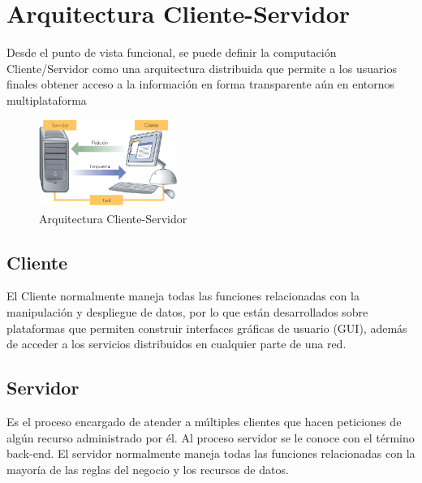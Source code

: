 \vspace{5cm}
\section{Arquitectura Cliente-Servidor}
Desde el punto de vista funcional, se puede definir la computación Cliente/Servidor como una arquitectura distribuida que permite a los usuarios finales obtener acceso a la información en forma transparente aún en entornos multiplataforma \cite{clientServ}
\\\newline
\begin{figure}[H]
\centering
\includegraphics[width=0.4\textwidth]{imagenes/servidor1}
\caption{Arquitectura Cliente-Servidor}
\label{img:clientserv}
\end{figure}
    
\subsection{Cliente}
El Cliente normalmente maneja todas las funciones relacionadas con la manipulación y despliegue de datos, por lo que están desarrollados sobre plataformas que permiten construir interfaces gráficas de usuario (GUI), además de acceder a los servicios distribuidos en cualquier parte de una red. \cite{clientServ} 
\\\newline
\subsection{Servidor}
Es el proceso encargado de atender a múltiples clientes que hacen peticiones de algún recurso administrado por él. Al proceso servidor se le conoce con el término back-end.
El servidor normalmente maneja todas las funciones relacionadas con la mayoría de las reglas del negocio y los recursos de datos. \cite{clientServ}
\vfill